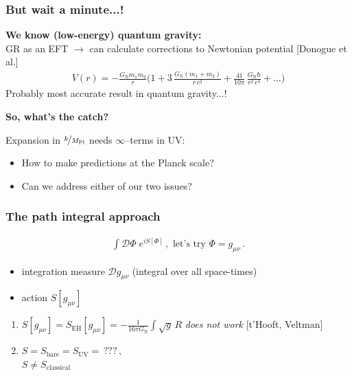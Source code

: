 \documentclass[]{beamer}  %
\newcommand\GNewton{ G_{\scriptscriptstyle{\mathrm{N}}}{} }
\newcommand\SEH{ S_{\scriptscriptstyle{\mathrm{EH}}}{} }
\newcommand\SUV{ S_{\scriptscriptstyle{\mathrm{UV}}}{} }
\newcommand\Sbare{ S_{\scriptscriptstyle{\mathrm{bare}}}{} }
\newcommand\Sclass{ S_{\scriptscriptstyle{\mathrm{classical}}}{} }
\newcommand\MPl{ M_{\scriptscriptstyle{\mathrm{Pl}}}{} }
\newcommand\metric{ g_{\mu\nu} }
\begin{document}
\addtocounter{framenumber}{-1}
\begin{frame}
  \frametitle{But wait a minute...!}
  \textbf{We know (low-energy) quantum gravity:}\\[5pt]
  GR as an EFT $\rightarrow$ can calculate corrections to Newtonian potential [Donogue et al.]
  \begin{align*}
    \boxed{
      V(r) = -\frac{\GNewton m_1 m_2}{r}
      \bigg(
        1
        + 3 \, \frac{\GNewton (m_1 + m_2)}{r \, c^2}
        + \frac{41}{10 \pi} \, \frac{\GNewton \hbar}{r^2 \, c^3}
        + \dots
      \bigg)
    }
  \end{align*}
  \hfill Probably most accurate result in quantum gravity...!
  \pause
  \vfill
  \begin{center}
    \fontsize{12pt}{7.2}\selectfont
    \textbf{ So, what's the catch? }
  \end{center}
  \pause
  \vspace{10pt}
  Expansion in $\nicefrac{k}{\MPl}$ needs $\infty$--terms in UV:\\[5pt]
  \begin{itemize}
    \item How to make predictions at the Planck scale?\\[5pt]
    \item Can we address either of our two issues?
  \end{itemize}
\end{frame}



\begin{frame}
  \frametitle{The path integral approach}
  \begin{align*}
    \boxed{
    \int \mathcal D \Phi \; e^{i S[\Phi]}\,,
    \text{ let's try } \Phi = \metric \,.
    }
  \end{align*}
  \vfill
  \begin{itemize}
    \item integration measure $\mathcal D \metric$ (integral over all space-times)
    \item action $S[\metric]$
  \end{itemize}
  \vfill
  \begin{enumerate}
    \item $S[\metric] = \SEH[\metric] = - \frac{1}{16 \pi \GNewton} \int \sqrt{g} \, R$
      \hspace{2pt}
      \textit{does not work} [t'Hooft, Veltman]\\[15pt]
    \item $S = \Sbare = \SUV = \, ???\,,$\\[5pt]
          $S \neq \Sclass$
  \end{enumerate}
\end{frame}
\end{document}

